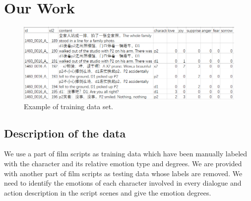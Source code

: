 \documentclass[12pt,twocolumn,letterpaper]{article}
\begin{document}
 

\section{Our Work}
\begin{figure}
\begin{center}
\includegraphics[scale=0.8]{data_sample.png}
\end{center}
   \caption{Example of training data set.}
\label{fig:short}
\end{figure}
\subsection{Description of the data}
 We use a part of film scripts as training data which have been manually labeled with the character and its relative emotion type and degrees. We are provided with another part of film scripts as testing data whose labels are removed. We need to identify the emotions of each character involved in every dialogue and action description in the script scenes and give the emotion degrees.
\end{document}
